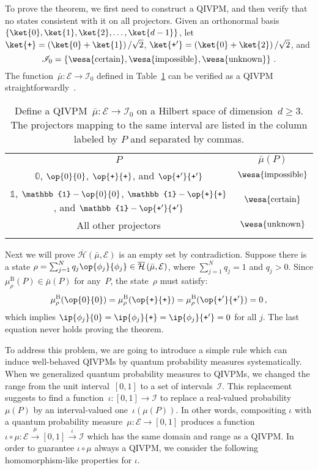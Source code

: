 \documentclass[english,reprint, aps, prl,superscriptaddress, showpacs,
showkeys, longbibliography, amsmath, amssymb, floatfix]{revtex4-1}
\theoremstyle{plain}
\theoremstyle{definition}
\newcommand{\Hilb}{\mathcal{H}}
\newcommand{\events}{\ensuremath{\mathcal{E}}}
\newcommand{\imposs}{{\text{\wesa{impossible}}}}
\newcommand{\necess}{{\text{\wesa{certain}}}}
\newcommand{\unknown}{{\text{\wesa{unknown}}}}
\newcommand{\proj}[1]{\op{#1}{#1}}
\newcommand{\ps}{\texttt{+}}
\newcommand{\coreBorn}{\ensuremath{\overline{\Hilb}}}
\begin{document}
To prove the theorem, we first need to construct a QIVPM, and then
verify that no states consistent with it on all projectors. Given
an orthonormal basis $\left\{ \ket{0},\ket{1},\ket{2},\ldots,\ket{d-1}\right\} $,
let $\ket{\ps}=\left(\ket{0}+\ket{1}\right)/\sqrt{2}$, $\ket{\ps'}=\left(\ket{0}+\ket{2}\right)/\sqrt{2}$,
and
\begin{equation}
\mathscr{I}_{0}=\left\{ \necess,\imposs,\unknown\right\} \,.\label{eq:3-value-intervals}
\end{equation}
The function~$\bar{\mu}:\events\rightarrow\mathscr{I}_{0}$ defined
in Table~\ref{tab:non-Born-QIVPM} can be verified as a QIVPM straightforwardly~\citep{HOSTunpublished}.
\begin{table}
\caption{\label{tab:non-Born-QIVPM}Define a QIVPM~$\bar{\mu}:\events\rightarrow\mathscr{I}_{0}$
on a Hilbert space of dimension~$d\ge3$. The projectors mapping
to the same interval are listed in the column labeled by $P$ and
separated by commas.}

\begin{tabular}{cc}
\toprule 
\addlinespace
$P$ & $\bar{\mu}\left(P\right)$\tabularnewline\addlinespace
\midrule
\midrule 
\addlinespace
$\mathbb{0}$, $\proj{0}$, $\proj{\ps}$, and $\proj{\ps'}$ & $\imposs$\tabularnewline\addlinespace
\midrule 
\addlinespace
$\mathbb{1}$, $\mathbb{1}-\proj{0}$, $\mathbb{1}-\proj{\ps}$, and
$\mathbb{1}-\proj{\ps'}$ & $\necess$\tabularnewline\addlinespace
\midrule 
\addlinespace
All other projectors & $\unknown$\tabularnewline\addlinespace
\bottomrule
\end{tabular}
\end{table}
Next we will prove $\coreBorn\left(\bar{\mu},\events\right)$ is an
empty set by contradiction. Suppose there is a state $\rho=\sum_{j=1}^{N}q_{j}\proj{\phi_{j}}\in\coreBorn\left(\bar{\mu},\events\right)$,
where $\sum_{j=1}^{N}q_{j}=1$ and $q_{j}>0$. Since $\mu_{\rho}^{\mathrm{B}}(P)\in\bar{\mu}(P)$
for any~$P$, the state~$\rho$ must satisfy: 
\begin{equation}
\mu_{\rho}^{\mathrm{B}}(\proj{0})=\mu_{\rho}^{\mathrm{B}}(\proj{\ps})=\mu_{\rho}^{\mathrm{B}}(\proj{\ps'})=0\,,
\end{equation}
which implies $\ip{\phi_{j}}{0}=\ip{\phi_{j}}{\ps}=\ip{\phi_{j}}{\ps'}=0$
for all $j$. The last equation never holds proving the theorem.

To address this problem, we are going to introduce a simple rule which
can induce well-behaved QIVPMs by quantum probability measures systematically.
When we generalized quantum probability measures to QIVPMs, we changed
the range from the unit interval~$\left[0,1\right]$ to a set of
intervals~$\mathscr{I}$. This replacement suggests to find a function~$\iota:\left[0,1\right]\rightarrow\mathscr{I}$
to replace a real-valued probability~$\mu\left(P\right)$ by an interval-valued
one~$\iota\left(\mu\left(P\right)\right)$. In other words, compositing
$\iota$ with a quantum probability measure~$\mu:\events\rightarrow\left[0,1\right]$
produces a function~$\iota\circ\mu:\events\overset{\mu}{\rightarrow}\left[0,1\right]\overset{\iota}{\rightarrow}\mathscr{I}$
which has the same domain and range as a QIVPM. In order to guarantee
$\iota\circ\mu$ always a QIVPM, we consider the following homomorphism-like
properties for $\iota$.
\end{document}
